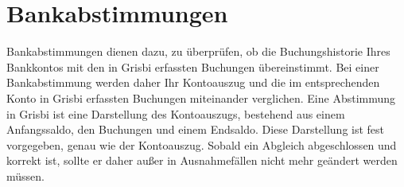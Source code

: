 %


\chapter{Bankabstimmungen\label{reconciliation}}

Bankabstimmungen dienen dazu, zu überprüfen, ob die Buchungshistorie Ihres Bankkontos mit den in Grisbi erfassten Buchungen übereinstimmt. Bei einer Bankabstimmung werden daher Ihr Kontoauszug und die im entsprechenden Konto in Grisbi erfassten Buchungen miteinander verglichen. Eine Abstimmung in Grisbi ist eine Darstellung des Kontoauszugs, bestehend aus einem Anfangssaldo, den Buchungen und einem Endsaldo. Diese Darstellung ist fest vorgegeben, genau wie der Kontoauszug. Sobald ein Abgleich abgeschlossen und korrekt ist, sollte er daher außer in Ausnahmefällen nicht mehr geändert werden müssen.

